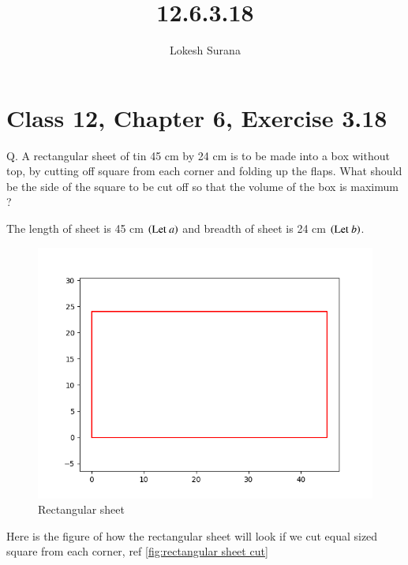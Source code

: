 \documentclass[journal,12pt,twocolumn]{IEEEtran}
\begin{document}
\vspace{3cm}
\title{12.6.3.18}
\author{Lokesh Surana}
\maketitle
\section*{Class 12, Chapter 6, Exercise 3.18}

Q. A rectangular sheet of tin 45 cm by 24 cm is to be made into a box without top, by cutting off square from each corner and folding up the flaps. What should be the side of the square to be cut off so that the volume of the box is maximum ?

\solution The length of sheet is 45 cm $\left(\text{Let } a\right)$ and breadth of sheet is 24 cm $\left(\text{Let }b\right)$.

\begin{figure}[!htb]
    \centering
    \includegraphics[width=\columnwidth]{figs/rectangle1.png}
    \caption{Rectangular sheet}
    \label{fig:rectangular sheet}
\end{figure}

Here is the figure of how the rectangular sheet will look if we cut equal sized square from each corner, ref \eqref{fig:rectangular sheet cut}
\end{document}

